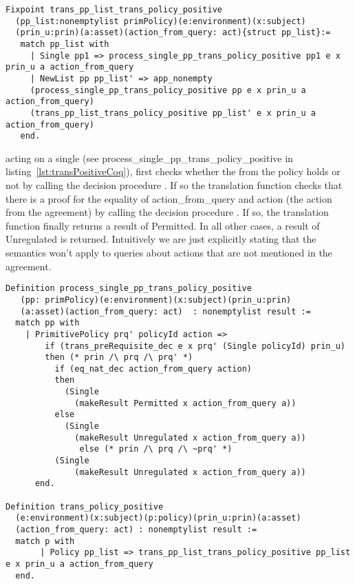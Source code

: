 \begin{lstlisting}
Fixpoint trans_pp_list_trans_policy_positive
  (pp_list:nonemptylist primPolicy)(e:environment)(x:subject)
  (prin_u:prin)(a:asset)(action_from_query: act){struct pp_list}:=
   match pp_list with
     | Single pp1 => process_single_pp_trans_policy_positive pp1 e x prin_u a action_from_query
     | NewList pp pp_list' => app_nonempty
	 (process_single_pp_trans_policy_positive pp e x prin_u a action_from_query) 
	 (trans_pp_list_trans_policy_positive pp_list' e x prin_u a action_from_query)
   end.
\end{lstlisting}


 acting on a single  (see process_single_pp_trans_policy_positive in listing~\ref{lst:transPositiveCoq}), first checks whether the  from the policy holds or not by calling the decision procedure . If so the translation function checks that there is a proof for the equality of action_from_query and action (the action from the agreement) by calling the decision procedure . If so, the translation function finally returns a result of Permitted. In all other cases, a result of Unregulated is returned. Intuitively we are just explicitly stating that the semantics won't apply to queries about actions that are not mentioned in the agreement.

\begin{lstlisting}
Definition process_single_pp_trans_policy_positive 
   (pp: primPolicy)(e:environment)(x:subject)(prin_u:prin)
   (a:asset)(action_from_query: act)  : nonemptylist result :=
  match pp with
    | PrimitivePolicy prq' policyId action =>
        if (trans_preRequisite_dec e x prq' (Single policyId) prin_u)
        then (* prin /\ prq /\ prq' *)
          if (eq_nat_dec action_from_query action)
          then
            (Single 
              (makeResult Permitted x action_from_query a))
          else
            (Single 
              (makeResult Unregulated x action_from_query a))
               else (* prin /\ prq /\ ~prq' *)
          (Single 
              (makeResult Unregulated x action_from_query a))
      end.

Definition trans_policy_positive
  (e:environment)(x:subject)(p:policy)(prin_u:prin)(a:asset)
  (action_from_query: act) : nonemptylist result :=
  match p with
       | Policy pp_list => trans_pp_list_trans_policy_positive pp_list e x prin_u a action_from_query
  end.

\end{lstlisting}


